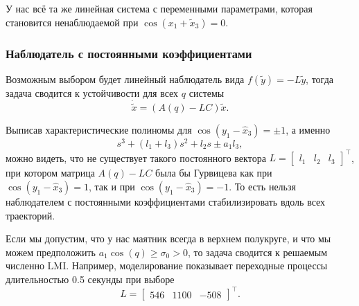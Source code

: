 \documentclass{article}
\begin{document}
У нас всё та же линейная система с переменными параметрами, которая становится ненаблюдаемой при $\cos(x_1+\tilde{x}_3) = 0$.

\subsubsection{Наблюдатель с постоянными коэффициентами}
Возможным выбором будет линейный наблюдатель вида $f(\tilde{y}) = -L\tilde{y}$, тогда задача сводится к устойчивости для всех $q$ системы 
\[
	\dot{\tilde{x}} = \left(A(q)-LC\right)\tilde{x}.
\]

Выписав характеристические полиномы для $\cos(y_1-\hat{x}_3)=\pm 1$,  а именно
\[
	s^3 + (l_1+l_3)s^2+l_2s \pm a_1l_3,
\]
можно видеть, что не существует такого постоянного вектора $L=\begin{bmatrix}l_1 & l_2 & l_3\end{bmatrix}^\top$, при котором матрица $A(q)-LC$ была бы Гурвицева как при $\cos(y_1-\hat{x}_3)=1$, так и при $\cos(y_1-\hat{x}_3)=-1$. То есть нельзя наблюдателем с постоянными коэффициентами стабилизировать вдоль всех траекторий. 


Если мы допустим, что у нас маятник всегда в верхнем полукруге, и что мы можем предположить $a_1\cos(q)\ge\sigma_0>0$, то задача сводится к решаемым численно LMI. Например, моделирование показывает переходные процессы длительностью 0.5 секунды при выборе 
\[
	L=\begin{bmatrix}546 & 1100 & -508\end{bmatrix}^\top.
\]
\end{document}
